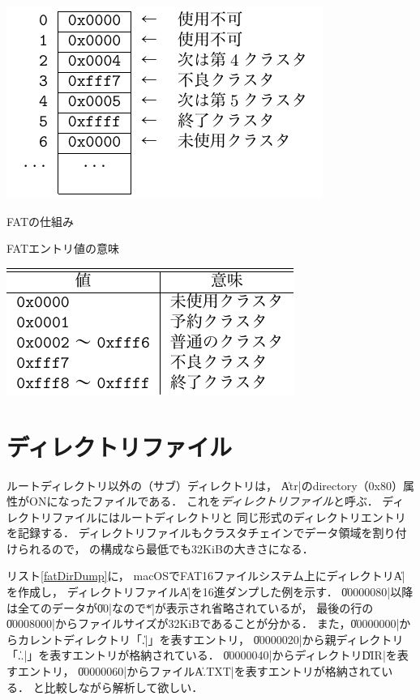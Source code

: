 \begin{table}[btp]
  \centering
  \begin{minipage}[c]{0.4\textwidth}
    \makeatletter
    \def\@captype{figure}
    \makeatother
    \centerline{\includegraphics[scale=1.0]{Fig/fatConcept.pdf}}
    \caption{FATの仕組み}
    \label{fig:fatConcept}
  \end{minipage}
  \begin{minipage}{0.5\textwidth}
    \caption{FATエントリ値の意味}
    \label{tab:fatClsNum}
    \centerline{\includegraphics[scale=1.0]{Tbl/fatClsNum.pdf}}
  \end{minipage}
\end{table}

\section{ディレクトリファイル}
ルートディレクトリ以外の（サブ）ディレクトリは，
\|Atr|のdirectory（0x80）属性がONになったファイルである．
これを\emph{ディレクトリファイル}と呼ぶ．
ディレクトリファイルにはルートディレクトリと
同じ形式のディレクトリエントリを記録する．
ディレクトリファイルもクラスタチェインでデータ領域を割り付けられるので，
の構成なら最低でも32KiBの大きさになる．

リスト\ref{fatDirDump}に，
macOSでFAT16ファイルシステム上にディレクトリ\|A|を作成し，
ディレクトリファイル\|A|を16進ダンプした例を示す．
\|00000080|以降は全てのデータが\|00|なので\|*|が表示され省略されているが，
最後の行の\|00008000|からファイルサイズが32KiBであることが分かる．
また，\|00000000|からカレントディレクトリ「\|.|」を表すエントリ，
\|00000020|から親ディレクトリ「\|..|」を表すエントリが格納されている．
\|00000040|からディレクトリ\|DIR|を表すエントリ，
\|00000060|からファイル\|A.TXT|を表すエントリが格納されている．
と比較しながら解析して欲しい．

